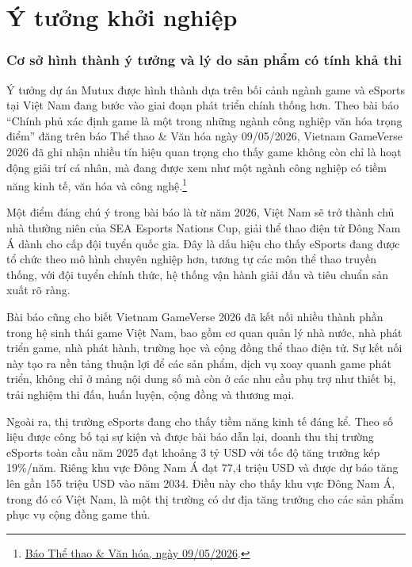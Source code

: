 \part{Ý tưởng khởi nghiệp}
\section{Cơ sở hình thành ý tưởng và lý do sản phẩm có tính khả thi}

Ý tưởng dự án Mutux được hình thành dựa trên bối cảnh ngành game và eSports tại Việt Nam đang bước vào giai đoạn phát triển chính thống hơn. Theo bài báo ``Chính phủ xác định game là một trong những ngành công nghiệp văn hóa trọng điểm'' đăng trên báo Thể thao \& Văn hóa ngày 09/05/2026, Vietnam GameVerse 2026 đã ghi nhận nhiều tín hiệu quan trọng cho thấy game không còn chỉ là hoạt động giải trí cá nhân, mà đang được xem như một ngành công nghiệp có tiềm năng kinh tế, văn hóa và công nghệ.\footnote{\href{https://thethaovanhoa.vn/chinh-phu-xac-dinh-game-la-mot-trong-nhung-nganh-cong-nghiep-van-hoa-trong-diem-20260509142546065.htm}{Báo Thể thao \& Văn hóa, ngày 09/05/2026}.}

Một điểm đáng chú ý trong bài báo là từ năm 2026, Việt Nam sẽ trở thành chủ nhà thường niên của SEA Esports Nations Cup, giải thể thao điện tử Đông Nam Á dành cho cấp đội tuyển quốc gia. Đây là dấu hiệu cho thấy eSports đang được tổ chức theo mô hình chuyên nghiệp hơn, tương tự các môn thể thao truyền thống, với đội tuyển chính thức, hệ thống vận hành giải đấu và tiêu chuẩn sản xuất rõ ràng.

Bài báo cũng cho biết Vietnam GameVerse 2026 đã kết nối nhiều thành phần trong hệ sinh thái game Việt Nam, bao gồm cơ quan quản lý nhà nước, nhà phát triển game, nhà phát hành, trường học và cộng đồng thể thao điện tử. Sự kết nối này tạo ra nền tảng thuận lợi để các sản phẩm, dịch vụ xoay quanh game phát triển, không chỉ ở mảng nội dung số mà còn ở các nhu cầu phụ trợ như thiết bị, trải nghiệm thi đấu, huấn luyện, cộng đồng và thương mại.

Ngoài ra, thị trường eSports đang cho thấy tiềm năng kinh tế đáng kể. Theo số liệu được công bố tại sự kiện và được bài báo dẫn lại, doanh thu thị trường eSports toàn cầu năm 2025 đạt khoảng 3 tỷ USD với tốc độ tăng trưởng kép 19\%/năm. Riêng khu vực Đông Nam Á đạt 77,4 triệu USD và được dự báo tăng lên gần 155 triệu USD vào năm 2034. Điều này cho thấy khu vực Đông Nam Á, trong đó có Việt Nam, là một thị trường có dư địa tăng trưởng cho các sản phẩm phục vụ cộng đồng game thủ.

